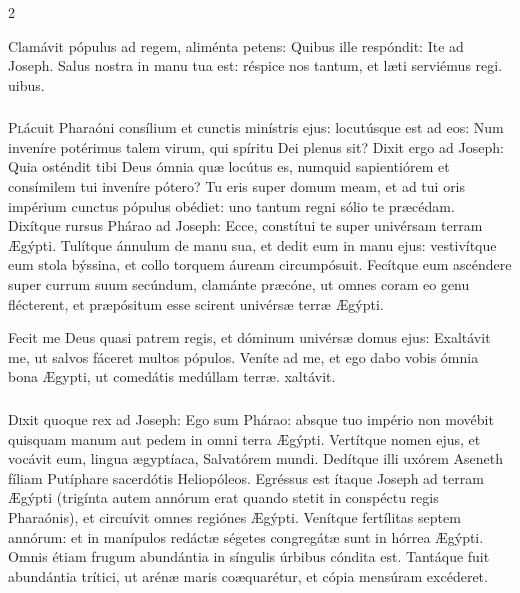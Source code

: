 \documentclass[9pt,twoside]{extarticle}
\begin{document}
\begin{multicols}{2}
\begin{tightlist}{}
\item {} Clamávit pópulus ad regem, aliménta petens: \textred{*} Quibus ille respóndit: Ite ad Joseph.  Salus nostra in manu tua est: réspice nos tantum, et læti serviémus regi. uibus.
\end{tightlist}

\subsubsection*{\center {}}
\lettrine{P}lácuit Pharaóni consílium et cunctis minístris ejus:
locutúsque est ad eos: Num inveníre potérimus talem virum, qui spíritu Dei plenus sit?
Dixit ergo ad Joseph: Quia osténdit tibi Deus ómnia quæ locútus es, numquid sapientiórem et consímilem tui inveníre pótero?
Tu eris super domum meam, et ad tui oris impérium cunctus pópulus obédiet: uno tantum regni sólio te præcédam.
Dixítque rursus Phárao ad Joseph: Ecce, constítui te super univérsam terram Ægýpti.
Tulítque ánnulum de manu sua, et dedit eum in manu ejus: vestivítque eum stola býssina, et collo torquem áuream circumpósuit.
Fecítque eum ascéndere super currum suum secúndum, clamánte præcóne, ut omnes coram eo genu flécterent, et præpósitum esse scirent univérsæ terræ Ægýpti.

\begin{tightlist}{}
\item {} Fecit me Deus quasi patrem regis, et dóminum univérsæ domus ejus: \textred{*} Exaltávit me, ut salvos fáceret multos pópulos.  Veníte ad me, et ego dabo vobis ómnia bona Ægypti, ut comedátis medúllam terræ. xaltávit.
\end{tightlist}

\subsubsection*{\center {}}
\lettrine{D}ixit quoque rex ad Joseph: Ego sum Phárao: absque tuo império non movébit quisquam manum aut pedem in omni terra Ægýpti.
Vertítque nomen ejus, et vocávit eum, lingua ægyptíaca, Salvatórem mundi. Dedítque illi uxórem Aseneth fíliam Putíphare sacerdótis Heliopóleos. Egréssus est ítaque Joseph ad terram Ægýpti
(trigínta autem annórum erat quando stetit in conspéctu regis Pharaónis), et circuívit omnes regiónes Ægýpti.
Venítque fertílitas septem annórum: et in manípulos redáctæ ségetes congregátæ sunt in hórrea Ægýpti.
Omnis étiam frugum abundántia in síngulis úrbibus cóndita est.
Tantáque fuit abundántia trítici, ut arénæ maris coæquarétur, et cópia mensúram excéderet.


\end{multicols}
\end{document}
